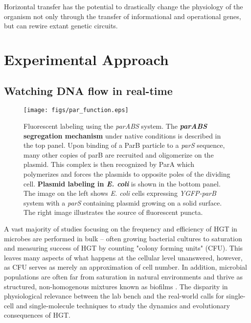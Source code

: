 Horizontal transfer has the potential to drastically change the physiology of
the organism not only through the transfer of informational and operational
genes, but can rewire extant genetic circuits.

\section*{Experimental Approach} 
\subsection*{Watching DNA flow in real-time}
\begin{wrapfigure}{l}{0.5\textwidth}
	\centerline{\texttt{[image: figs/par\_function.eps]}}
	\caption{Fluorescent labeling using the \textit{parABS} system. The {\bf
		\textit{parABS} segregation mechanism} under native conditions
		is described in the top panel. Upon binding of a ParB particle to a 
		\textit{parS} sequence, many other copies of parB are recruited
		and oligomerize on the plasmid. This complex is then recognized
	by ParA which polymerizes and forces the plasmids to opposite poles of
	the dividing cell. {\bf Plasmid labeling in \textit{E. coli}} is shown
	in the bottom panel. The image on the left shows \textit{E. coli} cells
	expressing \textit{YGFP-parB} system with a \textit{parS} containing
plasmid growing on a solid surface. The right image illustrates the source of
fluorescent puncta.}
	\label{fig:par_system}
\end{wrapfigure}



A vast majority of studies focusing on the frequency and efficiency of HGT in
microbes are performed in bulk -- often growing bacterial cultures to saturation
and measuring success of HGT by counting "colony forming units" (CFU). This leaves
many aspects of what happens at the cellular level unanswered, however, as CFU
serves as merely an approximation of cell number. In addition, microbial
populations are often far from saturation in natural
environments\cite{Vieira:2005jw, Whitman:1998tj} and thrive as structured,
non-homogenous mixtures known as biofilms \cite{HallStoodley:2004cv}. The
disparity in physiological relevance between the lab bench and the real-world
calls for single-cell and single-molecule techniques to study the dynamics and
evolutionary consequences of HGT.

